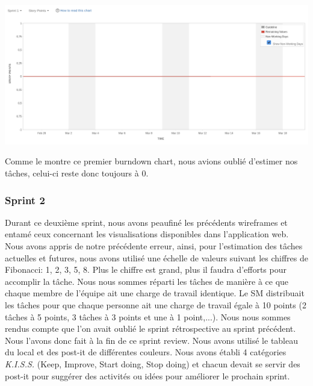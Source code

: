 \documentclass[t, 12pt, usenames,dvipsnames]{article}
\begin{document}
                
                 \begin{center}
                    \includegraphics[scale=.25]{images/graph-new/sprint1.png}
                    \label{fig:sprint1_graph}
                \end{center}
                Comme le montre ce premier burndown chart, nous avions oublié d'estimer nos tâches, celui-ci reste donc toujours à 0.
                
                
            \subsubsection{Sprint 2}
                \noindent Durant ce deuxième sprint, nous avons peaufiné les précédents wireframes et entamé ceux concernant les visualisations disponibles dans l'application web. Nous avons appris de notre précédente erreur, ainsi, pour l'estimation des tâches actuelles et futures, nous avons utilisé une échelle de valeurs suivant les chiffres de Fibonacci: 1, 2, 3, 5, 8. Plus le chiffre est grand, plus il faudra d'efforts pour accomplir la tâche. Nous nous sommes réparti les tâches de manière à ce que chaque membre de l'équipe ait une charge de travail identique. Le SM distribuait les tâches pour que chaque personne ait une charge de travail égale à 10 points (2 tâches à 5 points, 3 tâches à 3 points et une à 1 point,...).
                \newline
                Nous nous sommes rendus compte que l'on avait oublié le sprint rétrospective au sprint précédent. Nous l'avons donc fait à la fin de ce sprint review. 
                Nous avons utilisé le tableau du local et des post-it de différentes couleurs. Nous avons établi 4 catégories \textit{K.I.S.S.} (Keep, Improve, Start doing, Stop doing) et chacun devait se servir des post-it pour suggérer des activités ou idées pour améliorer le prochain sprint.
\end{document}

